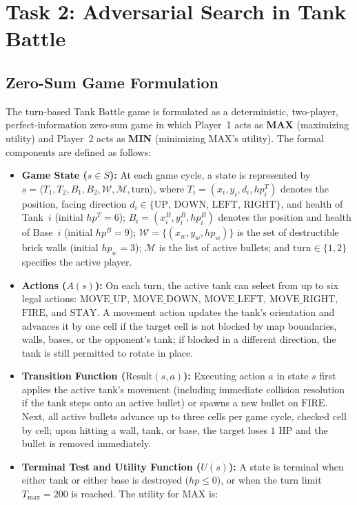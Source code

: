 \section{Task 2: Adversarial Search in Tank Battle}

\subsection{Zero-Sum Game Formulation}
The turn-based Tank Battle game is formulated as a deterministic, two-player, perfect-information zero-sum game in which Player~1 acts as \textbf{MAX} (maximizing utility) and Player~2 acts as \textbf{MIN} (minimizing MAX's utility). The formal components are defined as follows:

\begin{itemize}
    \item \textbf{Game State ($s \in S$):} At each game cycle, a state is represented by $s = \langle T_1, T_2, B_1, B_2, \mathcal{W}, \mathcal{M}, \text{turn} \rangle$, where $T_i = (x_i, y_i, d_i, hp^T_i)$ denotes the position, facing direction $d_i \in \{\text{UP, DOWN, LEFT, RIGHT}\}$, and health of Tank~$i$ (initial $hp^T = 6$); $B_i = (x^B_i, y^B_i, hp^B_i)$ denotes the position and health of Base~$i$ (initial $hp^B = 9$); $\mathcal{W} = \{(x_w, y_w, hp_w)\}$ is the set of destructible brick walls (initial $hp_w = 3$); $\mathcal{M}$ is the list of active bullets; and $\text{turn} \in \{1, 2\}$ specifies the active player.
    \item \textbf{Actions ($A(s)$):} On each turn, the active tank can select from up to six legal actions: $\text{MOVE\_UP}$, $\text{MOVE\_DOWN}$, $\text{MOVE\_LEFT}$, $\text{MOVE\_RIGHT}$, $\text{FIRE}$, and $\text{STAY}$. A movement action updates the tank's orientation and advances it by one cell if the target cell is not blocked by map boundaries, walls, bases, or the opponent's tank; if blocked in a different direction, the tank is still permitted to rotate in place.
    \item \textbf{Transition Function ($\text{Result}(s, a)$):} Executing action $a$ in state $s$ first applies the active tank's movement (including immediate collision resolution if the tank steps onto an active bullet) or spawns a new bullet on $\text{FIRE}$. Next, all active bullets advance up to three cells per game cycle, checked cell by cell; upon hitting a wall, tank, or base, the target loses $1\text{ HP}$ and the bullet is removed immediately.
    \item \textbf{Terminal Test and Utility Function ($U(s)$):} A state is terminal when either tank or either base is destroyed ($hp \le 0$), or when the turn limit $T_{\max} = 200$ is reached. The utility for MAX is:

\end{itemize}
